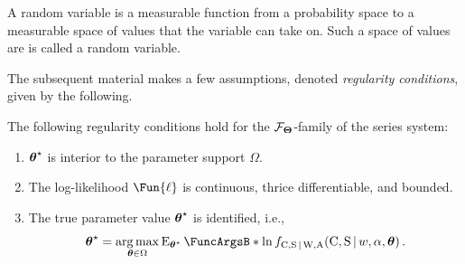 \documentclass[
    11pt,
    extrafontsizes,
    article,
    oldfontcommands,
    final,
    oneside,
    openany,
    hidelinks]{memoir}
\begin{document}

A random variable is a measurable function from a probability space to a measurable space of values that the variable can take on.
Such a space of values are is called a random variable.



The subsequent material makes a few assumptions, denoted \emph{regularity conditions}, given by the following.
\begin{assumption}
\label{def:reg_cond}
The following regularity conditions hold for the $\mathcal{F}_{\boldsymbol{\Theta}}$-family of the series system:
\begin{enumerate}
    \item ${\boldsymbol{\mathbf{\theta}}}^{\star}$ is interior to the parameter support $\Omega$.
    \item The log-likelihood $\Fun{\ell}$ is continuous, thrice differentiable, and bounded.
    \item{
        The true parameter value ${\boldsymbol{\mathbf{\theta}}}^{\star}$ is identified, i.e.,
        \begin{equation}
            \tparam\sysparamvec = \argmax_{\sysparamvec \in \Omega} \Expect{\ln \pdf_{\rvcand,\sv \given \RV{W},\RV{A}}(\rvcand, \sv \given w, \alpha, \sysparamvec)}[\tparam\sysparamvec]\,.
        \end{equation}
    }
\end{enumerate}
\end{assumption}
\end{document}
